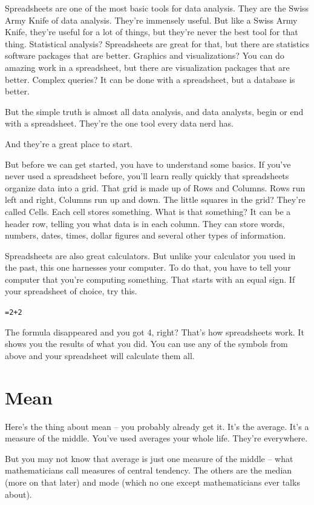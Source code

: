 \documentclass[
]{book}
\begin{document}
Spreadsheets are one of the most basic tools for data analysis. They are the Swiss Army Knife of data analysis. They're immensely useful. But like a Swiss Army Knife, they're useful for a lot of things, but they're never the best tool for that thing. Statistical analysis? Spreadsheets are great for that, but there are statistics software packages that are better. Graphics and visualizations? You can do amazing work in a spreadsheet, but there are visualization packages that are better. Complex queries? It can be done with a spreadsheet, but a database is better.

But the simple truth is almost all data analysis, and data analysts, begin or end with a spreadsheet. They're the one tool every data nerd has.

And they're a great place to start.

But before we can get started, you have to understand some basics. If you've never used a spreadsheet before, you'll learn really quickly that spreadsheets organize data into a grid. That grid is made up of Rows and Columns. Rows run left and right, Columns run up and down. The little squares in the grid? They're called Cells. Each cell stores something. What is that something? It can be a header row, telling you what data is in each column. They can store words, numbers, dates, times, dollar figures and several other types of information.

Spreadsheets are also great calculators. But unlike your calculator you used in the past, this one harnesses your computer. To do that, you have to tell your computer that you're computing something. That starts with an equal sign. If your spreadsheet of choice, try this.

\texttt{=2+2}

The formula disappeared and you got 4, right? That's how spreadsheets work. It shows you the results of what you did. You can use any of the symbols from above and your spreadsheet will calculate them all.

\hypertarget{mean}{%
\chapter{Mean}\label{mean}}

Here's the thing about mean -- you probably already get it. It's the average. It's a measure of the middle. You've used averages your whole life. They're everywhere.

But you may not know that average is just one measure of the middle -- what mathematicians call measures of central tendency. The others are the median (more on that later) and mode (which no one except mathematicians ever talks about).
\end{document}
